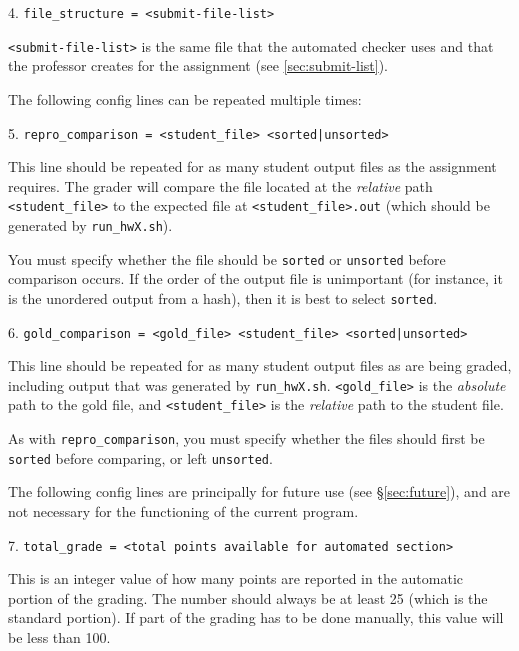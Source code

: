 \documentclass[12pt]{article}
\begin{document}
\vspace{5pt}

4. \texttt{file\_structure = <submit-file-list>}

\texttt{<submit-file-list>} is the same file that the automated checker uses and that the professor creates for the assignment (see \ref{sec:submit-list}).

\vspace{5pt}

\noindent The following config lines can be repeated multiple times:

5. \texttt{repro\_comparison = <student\_file> <sorted|unsorted>}

This line should be repeated for as many student output files as the assignment requires. The grader will compare the file located at the \textit{relative} path \texttt{<student\_file>} to the expected file at \texttt{<student\_file>.out} (which should be generated by \texttt{run\_hwX.sh}).

You must specify whether the file should be \texttt{sorted} or \texttt{unsorted} before comparison occurs. If the order of the output file is unimportant (for instance, it is the unordered output from a hash), then it is best to select \texttt{sorted}.

\vspace{5pt}

6. \texttt{gold\_comparison = <gold\_file> <student\_file> <sorted|unsorted>}

This line should be repeated for as many student output files as are being graded, including output that was generated by \texttt{run\_hwX.sh}. \texttt{<gold\_file>} is the \textit{absolute} path to the gold file, and \texttt{<student\_file>} is the \textit{relative} path to the student file.

As with \texttt{repro\_comparison}, you must specify whether the files should first be \texttt{sorted} before comparing, or left \texttt{unsorted}.

\vspace{5pt}

\noindent The following config lines are principally for future use (see \S\ref{sec:future}), and are not necessary for the functioning of the current program.

\vspace{5pt}

7. \texttt{total\_grade = <total points available for automated section>}

  This is an integer value of how many points are reported in the automatic portion of the grading. The number should always be at least 25 (which is the standard portion). If part of the grading has to be done manually, this value will be less than 100.
  
\end{document}
